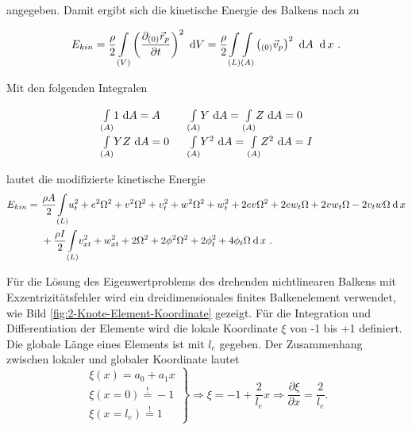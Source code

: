 	angegeben. Damit ergibt sich die kinetische Energie des Balkens nach \cite{gross2004technische} zu
	
	\begin{equation}\label{equ:Ekin}
	E_{kin} = \dfrac{\rho}{2} \underset{(V)}{\int} \left( \dfrac{\partial _{\left( 0\right) }\vec{r}_{p}}{\partial t} \right)^{2} \ \mathrm{d}V
	= \dfrac{\rho}{2} \underset{(L)}{\int} \underset{(A)}{\int} \left( _{\left( 0\right) }\vec{v}_{p}\right) ^{2} \ \mathrm{d}A \ \dx \ .
	\end{equation}
	
	Mit den folgenden Integralen
	
	\begin{equation}\label{equ:Ekin-Ansatz}
	\setlength{\arraycolsep}{8pt}
	\renewcommand{\arraystretch}{1.3}
	\begin{array}{ll}
	\underset{(A)}{\int} 1 \ \mathrm{d}A = A & \underset{(A)}{\int} Y \ \mathrm{d}A = \underset{(A)}{\int} Z \ \mathrm{d}A = 0\\
	\underset{(A)}{\int} YZ \ \mathrm{d}A =0 & \underset{(A)}{\int} Y^{2} \ \mathrm{d}A = \underset{(A)}{\int} Z^{2} \ \mathrm{d}A = I
	\end{array}
	\end{equation}
	
	lautet die modifizierte kinetische Energie
	\begin{equation}\label{equ:Mod.-Ekin}
	\begin{aligned}
	E_{kin} = \ & \dfrac{\rho A}{2} \underset{(L)}{\int} u_{t}^{2}+e^{2}\Omega^{2}+v^{2}\Omega^{2}+v_{t}^{2}+w^{2}\Omega^{2}+w_{t}^{2}+2ev\Omega^{2}+2ew_{t}\Omega+2vw_{t}\Omega-2v_{t}w\Omega \: \mathrm{d}\, x\\
	& +\dfrac{\rho I}{2} \underset{(L)}{\int} v_{xt}^{2}+w_{xt}^{2}+2\Omega^{2}+2\phi^{2}\Omega^{2}+2\phi_{t}^{2}+4\phi_{t}\Omega \: \mathrm{d}\, x \ .
	\end{aligned}
	\end{equation}
	
	
	Für die Lösung des Eigenwertproblems des drehenden nichtlinearen Balkens mit Exzentrizitätsfehler wird ein dreidimensionales finites Balkenelement verwendet, wie Bild \ref{fig:2-Knote-Element-Koordinate} gezeigt. Für die Integration und Differentiation der Elemente wird die lokale Koordinate $\xi$ von -1 bis +1 definiert. Die globale Länge eines Elements ist mit $ l_{e} $ gegeben. Der Zusammenhang zwischen lokaler und globaler Koordinate lautet
	\begin{equation}\label{equ:Lokal-zu-global}
	\left. 
	\begin{array}{l}
	\xi (x) = a_{0} + a_{1}x\\
	\xi (x=0) \overset{!}{=} -1\\
	\xi (x=l_{e})  \overset{!}{=} 1
	\end{array} 
	\right\rbrace \Rightarrow 
	\xi = -1 + \frac{2}{l_{e}}x
	\Rightarrow
	\frac{\partial \xi}{\partial x} = \frac{2}{l_{e}}.
	\end{equation}
	
